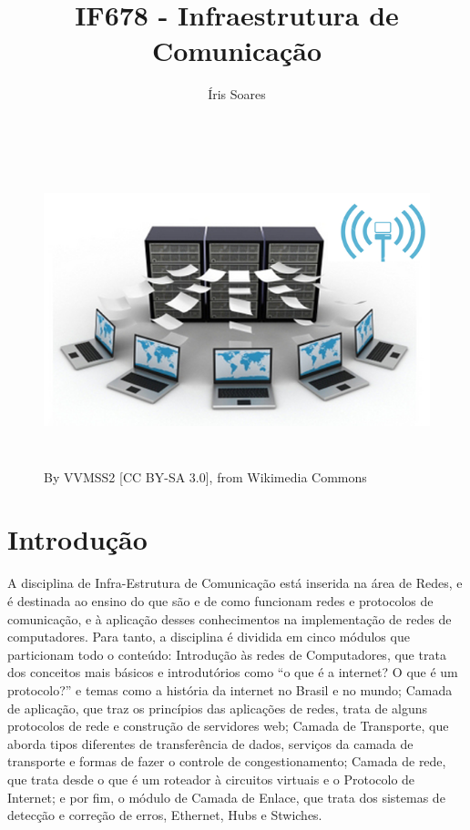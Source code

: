 \documentclass[10pt, a4paper]{article}
\title{IF678 - Infraestrutura de Comunicação}
\author{Íris Soares}
\begin{document}
\maketitle

\begin{figure} [h]
\centering
\includegraphics[height=9cm]{iss3.png}
\caption{By VVMSS2 [CC BY-SA 3.0], from Wikimedia Commons}
\end{figure}

\section{Introdução}

A disciplina de Infra-Estrutura de Comunicação está inserida na área de Redes, e é destinada ao ensino do que são e de como funcionam redes e protocolos de comunicação, e à aplicação desses conhecimentos na implementação de redes de computadores. Para tanto, a disciplina é dividida em cinco módulos que particionam todo o conteúdo: Introdução às redes de Computadores, que trata dos conceitos mais básicos e introdutórios como “o que é a internet? O que é um protocolo?” e temas como a história da internet no Brasil e no mundo; Camada de aplicação, que traz os princípios das aplicações de redes, trata de alguns protocolos de rede e construção de servidores web; Camada de Transporte, que aborda tipos diferentes de transferência de dados, serviços da camada de transporte e formas de fazer o controle de congestionamento; Camada de rede, que trata desde o que é um roteador à circuitos virtuais e o Protocolo de Internet; e por fim, o módulo de Camada de Enlace, que trata dos sistemas de detecção e correção de erros, Ethernet, Hubs e Stwiches.\cite{jk}
\end{document}
